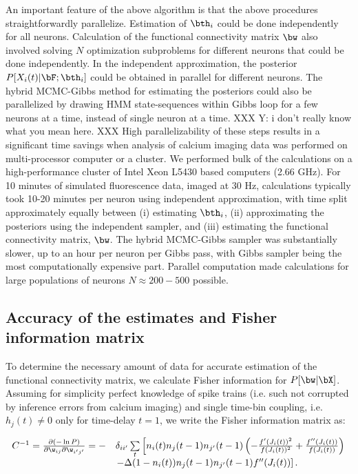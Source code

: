 An important feature of the above algorithm is that the above procedures straightforwardly parallelize. Estimation of  $\bth_i$ could be done independently for all neurons. Calculation of the functional connectivity matrix $\bw$ also involved solving $N$ optimization subproblems for different neurons that could be done independently. In the independent approximation, the posterior $P[X_i(t) | \bF; \bth_i]$ could be obtained in parallel for different neurons.  The hybrid MCMC-Gibbs method for estimating the posteriors could also be parallelized by drawing HMM state-sequences within Gibbs loop for a few neurons at a time, instead of single neuron at a time. XXX Y: i don't really know what you mean here. XXX High parallelizability of these steps results in a significant time savings when analysis of calcium imaging data was performed on multi-processor computer or a cluster.  We performed bulk of the calculations on a high-performance cluster of Intel Xeon L5430 based computers (2.66 GHz). For 10 minutes of simulated fluorescence data, imaged at $30$ Hz, calculations typically took 10-20 minutes per neuron using independent approximation, with time split approximately equally between (i) estimating $\bth_i$,  (ii) approximating the posteriors using the independent sampler, and (iii) estimating the functional connectivity matrix, $\bw$. The hybrid MCMC-Gibbs sampler was substantially slower, up to an hour per neuron per Gibbs pass, with Gibbs sampler being the most computationally expensive part. Parallel computation made calculations for large populations of neurons $N\approx 200-500$ possible.

\subsection{Accuracy of the estimates and Fisher information matrix} \label{sec:methods:accuracy_Fisher}

To determine the necessary amount of data for accurate estimation of the functional connectivity matrix, we calculate Fisher information for $P[\bw| \bX]$. Assuming for simplicity perfect knowledge of spike trains (i.e. such not corrupted by inference errors from calcium imaging) and single time-bin coupling, i.e. $h_{j}(t)\neq 0$ only for time-delay $t=1$, we write the Fisher information matrix as:

\begin{equation}
\begin{array}{rl}
C^{-1}=\frac{\partial (-\ln P)}{\partial \w_{ij}\partial \w_{i'j'}}
=-&\delta_{ii'}\sum\limits_t\left[
n_i(t)n_{j}(t-1)n_{j'}(t-1)\left(-\frac{f'(J_i(t))^2}{f(J_i(t))^2} +
\frac{f''(J_i(t))}{f(J_i(t))}\right) \right. \\
&\left.-\Delta (1-n_i(t))n_{j}(t-1)n_{j'}(t-1)f''(J_i(t))\right].
\end{array}
\end{equation}

